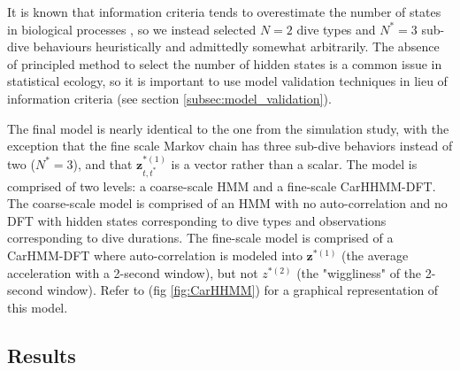 It is known that information criteria tends to overestimate the number of states in biological processes \citep{Pohle:2017}, so we instead selected $N = 2$ dive types and $N^* = 3$ sub-dive behaviours heuristically and admittedly somewhat arbitrarily. The absence of principled method to select the number of hidden states is a common issue in statistical ecology, so it is important to use model validation techniques in lieu of information criteria (see section \ref{subsec:model_validation}).

The final model is nearly identical to the one from the simulation study, with the exception that the fine scale Markov chain has three sub-dive behaviors instead of two ($N^* = 3$), and that $\mathbf{z}^{*(1)}_{t,t^*}$ is a vector rather than a scalar. The model is comprised of two levels: a coarse-scale HMM and a fine-scale CarHHMM-DFT. The coarse-scale model is comprised of an HMM with no auto-correlation and no DFT with hidden states corresponding to dive types and observations corresponding to dive durations. The fine-scale model is comprised of a CarHMM-DFT where auto-correlation is modeled into $\mathbf{z}^{*(1)}$ (the average acceleration with a 2-second window), but not $z^{*(2)}$ (the "wiggliness" of the 2-second window). Refer to (fig \ref{fig:CarHHMM}) for a graphical representation of this model.

\subsection{Results}

